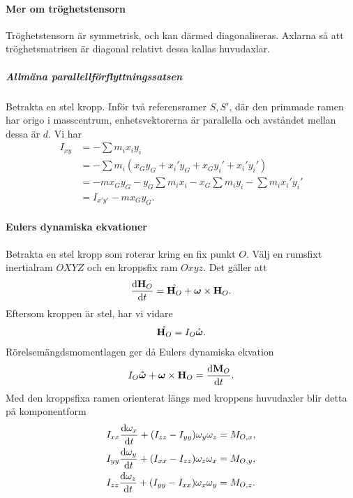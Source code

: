 \paragraph{Mer om tröghetstensorn}
Tröghetstensorn är symmetrisk, och kan därmed diagonaliseras. Axlarna så att tröghetsmatrisen är diagonal relativt dessa kallas huvudaxlar.

\subparagraph{Allmäna parallellförflyttningssatsen}
Betrakta en stel kropp. Inför två referensramer $S, S'$, där den primmade ramen har origo i masscentrum, enhetsvektorerna är parallella och avståndet mellan dessa är $d$. Vi har
\begin{align*}
	I _{xy} &= -\sum m_{i}x_{i}y_{i} \\
	        &= -\sum m_{i}(x_{G}y_{G} + x_{i}'y_{G} + x_{G}y_{i}' + x_{i}'y_{i}') \\
	        &= -mx_{G}y_{G} - y_{G}\sum m_{i}x_{i} - x_{G}\sum m_{i}y_{i} - \sum m_{i}x_{i}'y_{i}' \\
	        &= I_{x'y'} - mx_{G}y_{G}.
\end{align*}

\paragraph{Eulers dynamiska ekvationer}
Betrakta en stel kropp som roterar kring en fix punkt $O$. Välj en rumsfixt inertialram $OXYZ$ och en kroppsfix ram $Oxyz$. Det gäller att
\begin{align*}
	\dv{\vb{H}_{O}}{t} = \mathring{\vb{H}_{O}} + \vb*{\omega}\times\vb{H}_{O}.
\end{align*}
Eftersom kroppen är stel, har vi vidare
\begin{align*}
	\mathring{\vb{H}_{O}} = I_{O}\mathring{\vb*{\omega}}.
\end{align*}
Rörelsemängdsmomentlagen ger då Eulers dynamiska ekvation
\begin{align*}
	I_{O}\mathring{\vb*{\omega}} + \vb*{\omega}\times\vb{H}_{O} = \dv{\vb{M}_{O}}{t}.
\end{align*}
Med den kroppsfixa ramen orienterat längs med kroppens huvudaxler blir detta på komponentform
\begin{align*}
	I_{xx}\dv{\omega_{x}}{t} + (I_{zz} - I_{yy})\omega_{y}\omega_{z} &= M_{O, x}, \\
	I_{yy}\dv{\omega_{y}}{t} + (I_{xx} - I_{zz})\omega_{z}\omega_{x} &= M_{O, y}, \\
	I_{zz}\dv{\omega_{z}}{t} + (I_{yy} - I_{xx})\omega_{x}\omega_{y} &= M_{O, z}.
\end{align*}

